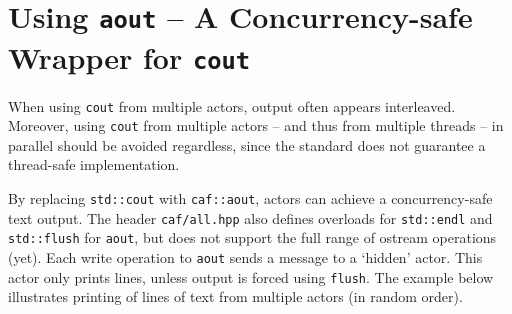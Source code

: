 \section{Using \texttt{aout} -- A Concurrency-safe Wrapper for \texttt{cout}}

When using \lstinline^cout^ from multiple actors, output often appears
interleaved. Moreover, using \lstinline^cout^ from multiple actors -- and thus
from multiple threads -- in parallel should be avoided regardless, since the
standard does not guarantee a thread-safe implementation.

By replacing \texttt{std::cout} with \texttt{caf::aout}, actors can achieve a
concurrency-safe text output. The header \lstinline^caf/all.hpp^ also defines
overloads for \texttt{std::endl} and \texttt{std::flush} for \lstinline^aout^,
but does not support the full range of ostream operations (yet). Each write
operation to \texttt{aout} sends a message to a `hidden' actor. This actor only
prints lines, unless output is forced using \lstinline^flush^. The example
below illustrates printing of lines of text from multiple actors (in random
order).

